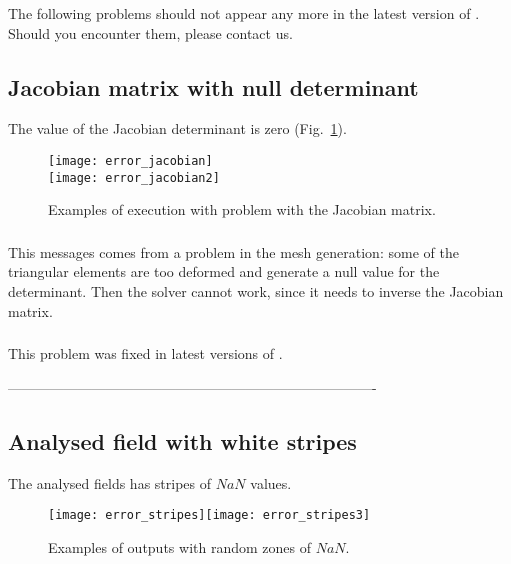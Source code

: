 The following problems should not appear any more in the latest version of \diva. Should you encounter them, please contact us.


\subsection{Jacobian matrix with null determinant}

The value of the Jacobian determinant is zero (Fig.~\ref{fig:error_jacobian}).
\begin{figure}[htpb]
\centering
\texttt{[image: error\_jacobian]}\\
\texttt{[image: error\_jacobian2]}
\caption{Examples of \diva execution with problem with the Jacobian matrix. \label{fig:error_jacobian}}
\end{figure}

\subsubsection{\question}

This messages comes from a problem in the mesh generation: some of the triangular elements are too deformed and generate a null value for the determinant. Then the solver cannot work, since it needs to inverse the Jacobian matrix.


\subsubsection{\answer}

This problem was fixed in latest versions of \diva. 

-------------------------------------------------------------------------------

\subsection{Analysed field with white stripes}

The analysed fields has stripes of $NaN$ values.

\begin{figure}[htpb]
\centering
\texttt{[image: error\_stripes]}\texttt{[image: error\_stripes3]}
\caption{Examples of \diva outputs with random zones of $NaN$.\label{fig:error_stripes2}}
\end{figure}

